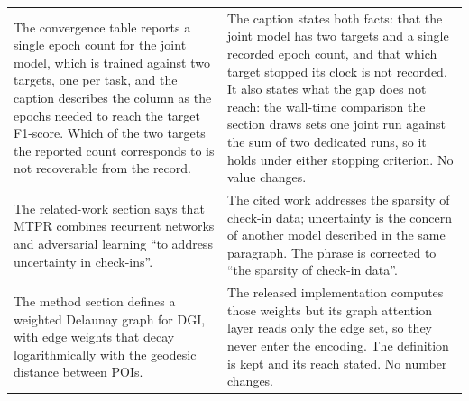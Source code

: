 {\begin{longtable}{@{}p{}p{}@{}}
The convergence table reports a single epoch count for the joint model, which is trained
against two targets, one per task, and the caption describes the column as the epochs
needed to reach the target F1-score. Which of the two targets the reported count
corresponds to is not recoverable from the record. &
The caption states both facts: that the joint model has two targets and a single recorded
epoch count, and that which target stopped its clock is not recorded. It also states what
the gap does not reach: the wall-time comparison the section draws sets one joint run
against the sum of two dedicated runs, so it holds under either stopping criterion. No
value changes. \\
\addlinespace
The related-work section says that MTPR combines recurrent networks and adversarial learning
``to address uncertainty in check-ins''. &
The cited work addresses the sparsity of check-in data; uncertainty is the concern of another
model described in the same paragraph. The phrase is corrected to ``the sparsity of check-in
data''. \\
\addlinespace
The method section defines a weighted Delaunay graph for DGI, with
edge weights that decay logarithmically with the geodesic distance
between POIs. &
The released implementation computes those weights but its graph
attention layer reads only the edge set, so they never enter the
encoding. The definition is kept and its reach stated. No number
changes. \\
\end{longtable}
}
